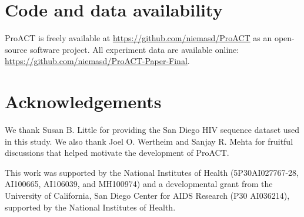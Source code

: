\documentclass[a4paper,10pt]{article}
\begin{document}
\section{Code and data availability}
ProACT is freely available at \url{https://github.com/niemasd/ProACT} as an open-source software project.
All experiment data are available online: \url{https://github.com/niemasd/ProACT-Paper-Final}.


\section{Acknowledgements}
We thank Susan B. Little for providing the San Diego HIV sequence dataset used in this study.
We also thank Joel O. Wertheim and Sanjay R. Mehta for fruitful discussions that helped motivate the development of ProACT.

This work was supported by the National Institutes of Health (5P30AI027767-28, AI100665, AI106039, and MH100974) and a developmental grant from the University of California, San Diego Center for AIDS Research (P30 AI036214), supported by the National Institutes of Health.

\bigskip\bigskip

\printbibliography
\end{document}
